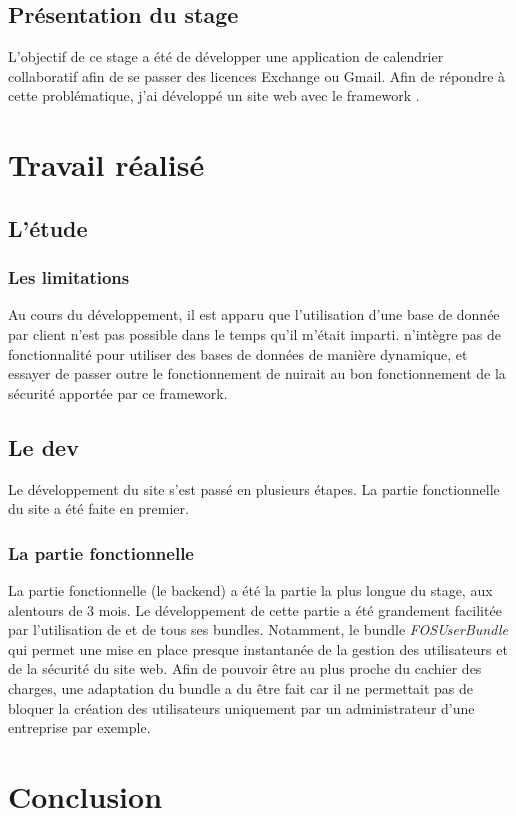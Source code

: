 \documentclass[a4paper, 11pt]{report}
\begin{document}
\chapter{Présentation du stage}
L'objectif de ce stage a été de développer une application de calendrier collaboratif afin de se passer des licences Exchange ou Gmail. Afin de répondre à cette problématique, j'ai développé un site web avec le framework \php \symfony.

\part{Travail réalisé}
\chapter{L'étude}
\section{Les limitations}
Au cours du développement, il est apparu que l'utilisation d'une base de donnée par client n'est pas possible dans le temps qu'il m'était imparti. \symfony n'intègre pas de fonctionnalité pour utiliser des bases de données de manière dynamique, et essayer de passer outre le fonctionnement de \symfony nuirait au bon fonctionnement de la sécurité apportée par ce framework.
\chapter{Le dev}
Le développement du site \agenda s'est passé en plusieurs étapes. La partie fonctionnelle du site a été faite en premier.
\section{La partie fonctionnelle}
La partie fonctionnelle (le backend) a été la partie la plus longue du stage, aux alentours de 3 mois. Le développement de cette partie a été grandement facilitée par l'utilisation de \symfony et de tous ses bundles. Notamment, le bundle \textit{FOSUserBundle} qui permet une mise en place presque instantanée de la gestion des utilisateurs et de la sécurité du site web. Afin de pouvoir être au plus proche du cachier des charges, une adaptation du bundle a du être fait car il ne permettait pas de bloquer la création des utilisateurs uniquement par un administrateur d'une entreprise par exemple.
\part{Conclusion}
\end{document}
